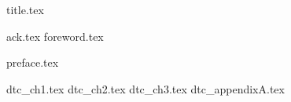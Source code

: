 \documentclass[12pt,letterpaper,oneside]{scrbook}
\begin{document}
\frontmatter

{title.tex}

\clearpage
\thispagestyle{empty}
{ack.tex}
{foreword.tex}

\tableofcontents

{preface.tex}

\mainmatter
{dtc_ch1.tex}
{dtc_ch2.tex}
{dtc_ch3.tex}
\appendix
{dtc_appendixA.tex}


\backmatter



\end{document}
